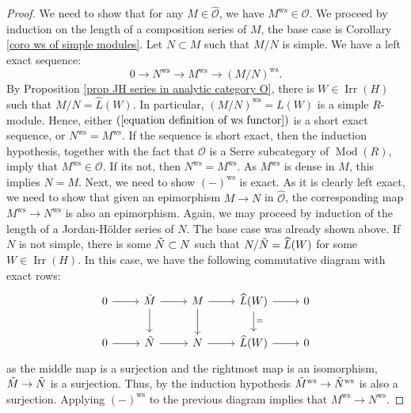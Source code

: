 \documentclass{amsart}
\newcommand{\Mod}{\operatorname{Mod}}
\newcommand{\OX}{\mathcal{O}}
\begin{document}
\begin{proof}
We need to show that for any $M\in \widehat{\OX}$, we have  $M^{\operatorname{ws}}\in\OX$. We proceed by induction on the length of a composition series of $M$, the base case is Corollary \ref{coro ws of simple modules}. Let $N\subset M$ such that $M/N$ is simple. We have a left exact sequence:
\begin{equation}\label{equation definition of ws functor}
    0\rightarrow N^{\operatorname{ws}}\rightarrow M^{\operatorname{ws}}\rightarrow (M/N)^{\operatorname{ws}}.
\end{equation}
By Proposition \ref{prop JH series in analytic category O}, there is  $W\in\operatorname{Irr}(H)$ such that $M/N=\widehat{L}(W)$. In particular, $(M/N)^{\operatorname{ws}}=L(W)$ is a simple $R$-module. Hence, either $(\ref{equation definition of ws functor})$ is a short exact sequence, or $N^{\operatorname{ws}}=M^{\operatorname{ws}}$. If the sequence is short exact, then the induction hypothesis, together with the fact that $\OX$ is a Serre subcategory of $\Mod(R)$, imply that $M^{\operatorname{ws}}\in \OX$. If its not, then  $N^{\operatorname{ws}}=M^{\operatorname{ws}}$. As $M^{\operatorname{ws}}$ is dense in $M$, this implies $N=M$.
Next, we need to show $(-)^{\operatorname{ws}}$ is exact. As it is clearly left exact, we need to show that given an epimorphism $M\rightarrow N$ in $\widehat{\OX}$, the corresponding map $M^{\operatorname{ws}}\rightarrow N^{\operatorname{ws}}$ is also an epimorphism. Again, we may proceed by induction of the length of a Jordan-Hölder series of $N$. The base case was already shown above. If $N$ is not simple, there is some $\Tilde{N}\subset N$ such that $N/\Tilde{N}=\widehat{L}(W)$ for some $W\in \operatorname{Irr}(H)$. In this case, we have the following commutative diagram with exact rows:
\begin{equation*}
\begin{tikzcd}
0 \arrow[r] & \Tilde{M} \arrow[r] \arrow[d] & M \arrow[r] \arrow[d] & \widehat{L}(W) \arrow[d, "="] \arrow[r] & 0 \\
0 \arrow[r] & \Tilde{N} \arrow[r]           & N \arrow[r]           & \widehat{L}(W) \arrow[r]                & 0
\end{tikzcd}
\end{equation*}
as the middle map is a surjection and the rightmost map is an isomorphism, $\Tilde{M}\rightarrow \Tilde{N}$ is a surjection. Thus, by the induction hypothesis $\Tilde{M}^{\operatorname{ws}}\rightarrow \Tilde{N}^{\operatorname{ws}}$ is also a surjection. Applying $(-)^{\operatorname{ws}}$ to the previous diagram  implies that $M^{\operatorname{ws}}\rightarrow N^{\operatorname{ws}}$.
\end{proof}
\end{document}
